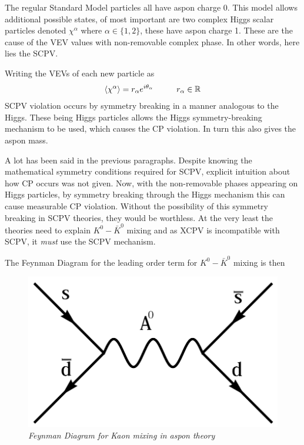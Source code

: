 \documentclass[floatfix,aps,prd,amsmath,amssymb]{revtex4}
\begin{document}
The regular Standard Model particles all have aspon charge 0. This model allows additional possible states, of most important are two complex Higgs scalar particles denoted $\chi^\alpha$ where $\alpha \in \{1,2\}$, these have aspon charge 1. These are the cause of the VEV values with non-removable complex phase. In other words, here lies the SCPV.

Writing the VEVs of each new particle as
\begin{align*}
\braket{\chi^\alpha}=r_\alpha e^{i \theta_\alpha}\hspace{10mm}r_\alpha \in \mathbb{R}
\end{align*}
SCPV violation occurs by symmetry breaking in a manner analogous to the Higgs. These being Higgs particles allows the Higgs symmetry-breaking mechanism to be used, which causes the CP violation. In turn this also gives the aspon mass.

A lot has been said in the previous paragraphs. Despite knowing the mathematical symmetry conditions required for SCPV, explicit intuition about how CP occurs was not given. Now, with the non-removable phases appearing on Higgs particles, by symmetry breaking through the Higgs mechanism this can cause measurable CP violation. Without the possibility of this symmetry breaking in SCPV theories, they would be worthless. At the very least the theories need to explain $K^0-\bar{K}^0$ mixing and as XCPV is incompatible with SCPV, it \textit{must} use the SCPV mechanism.

The Feynman Diagram for the leading order term for $K^0-\bar{K}^0$ mixing is then
\begin{figure}[h!]
\begin{center}
\includegraphics[scale=0.4]{figs/aspon_kaon.png}
\end{center}
\caption{\textit{Feynman Diagram for Kaon mixing in aspon theory }}
\label{asponkaon}
\end{figure}
\end{document}
